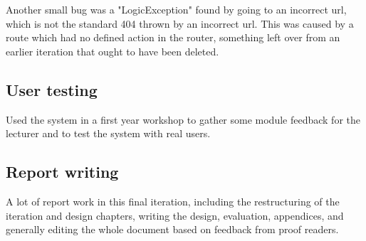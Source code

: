 Another small bug was a "LogicException" found by going to an incorrect url, which is not the standard 404 thrown by an incorrect url. This was caused by a route which had no defined action in the router, something left over from an earlier iteration that ought to have been deleted.

\subsection{User testing}
Used the system in a first year workshop to gather some module feedback for the lecturer and to test the system with real users.

\subsection{Report writing}
A lot of report work in this final iteration, including the restructuring of the iteration and design chapters, writing the design, evaluation, appendices, and generally editing the whole document based on feedback from proof readers.
\newpage